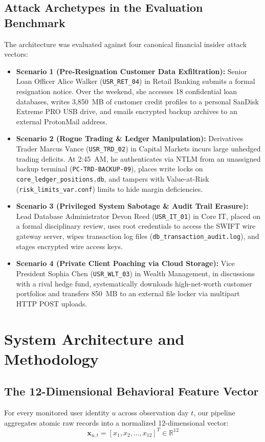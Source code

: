 \documentclass[conference]{IEEEtran}
\begin{document}
\subsection{Attack Archetypes in the Evaluation Benchmark}
The architecture was evaluated against four canonical financial insider attack vectors:
\begin{itemize}
    \item \textbf{Scenario 1 (Pre-Resignation Customer Data Exfiltration):} Senior Loan Officer Alice Walker (\texttt{USR\_RET\_04}) in Retail Banking submits a formal resignation notice. Over the weekend, she accesses 18 confidential loan databases, writes 3,850~MB of customer credit profiles to a personal SanDisk Extreme PRO USB drive, and emails encrypted backup archives to an external ProtonMail address.
    \item \textbf{Scenario 2 (Rogue Trading \& Ledger Manipulation):} Derivatives Trader Marcus Vance (\texttt{USR\_TRD\_02}) in Capital Markets incurs large unhedged trading deficits. At 2:45~AM, he authenticates via NTLM from an unassigned backup terminal (\texttt{PC-TRD-BACKUP-09}), places write locks on \texttt{core\_ledger\_positions.db}, and tampers with Value-at-Risk (\texttt{risk\_limits\_var.conf}) limits to hide margin deficiencies.
    \item \textbf{Scenario 3 (Privileged System Sabotage \& Audit Trail Erasure):} Lead Database Administrator Devon Reed (\texttt{USR\_IT\_01}) in Core IT, placed on a formal disciplinary review, uses root credentials to access the SWIFT wire gateway server, wipes transaction log files (\texttt{db\_transaction\_audit.log}), and stages encrypted wire access keys.
    \item \textbf{Scenario 4 (Private Client Poaching via Cloud Storage):} Vice President Sophia Chen (\texttt{USR\_WLT\_03}) in Wealth Management, in discussions with a rival hedge fund, systematically downloads high-net-worth customer portfolios and transfers 850~MB to an external file locker via multipart HTTP POST uploads.
\end{itemize}

\section{System Architecture and Methodology}

\subsection{The 12-Dimensional Behavioral Feature Vector}
For every monitored user identity $u$ across observation day $t$, our pipeline aggregates atomic raw records into a normalized 12-dimensional vector:
\begin{equation}
\mathbf{x}_{u, t} = [x_1, x_2, \dots, x_{12}]^T \in \mathbb{R}^{12}
\end{equation}
\end{document}
